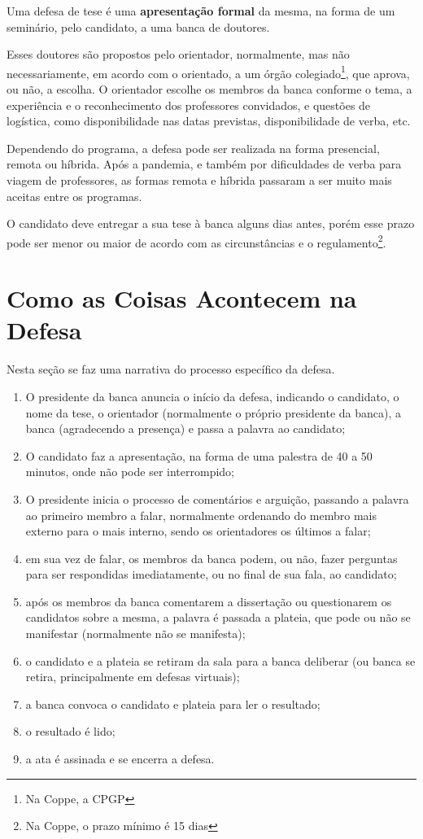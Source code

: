 Uma defesa de tese é uma \textbf{apresentação formal} da mesma, na forma de um seminário, pelo candidato, a uma banca de doutores.

Esses doutores são propostos pelo orientador, normalmente, mas não necessariamente, em acordo com o orientado, a um órgão colegiado\footnote{Na Coppe, a CPGP}, que aprova, ou não, a escolha. O orientador escolhe os membros da banca conforme o tema, a experiência e o reconhecimento dos professores convidados, e questões de logística, como disponibilidade nas datas previstas, disponibilidade de verba, etc.

Dependendo do programa, a defesa pode ser realizada na forma presencial, remota ou híbrida. Após a pandemia, e também por dificuldades de verba para viagem de professores, as formas remota e híbrida passaram a ser muito mais aceitas entre os programas.

O candidato deve entregar a sua tese  à banca alguns dias antes, porém esse prazo pode ser menor ou maior de acordo com as circunstâncias e o regulamento\footnote{Na Coppe, o prazo mínimo é 15 dias}. 


\section{Como as Coisas Acontecem na Defesa}

Nesta seção se faz uma narrativa do processo específico da defesa.

\begin{enumerate}
    \item O presidente da banca anuncia o início da defesa, indicando o candidato, o nome da tese, o orientador (normalmente o próprio presidente da banca), a banca (agradecendo a presença) e passa a palavra ao candidato;
    \item O candidato faz a apresentação, na forma de uma palestra de 40 a 50 minutos, onde não pode ser interrompido;
    \item O presidente inicia o processo de comentários e arguição, passando a palavra ao primeiro membro a falar, normalmente ordenando do membro mais externo para o mais interno, sendo os orientadores os últimos a falar;
    \item em sua vez de falar, os membros da banca podem, ou não, fazer perguntas para ser respondidas imediatamente, ou no final de sua fala, ao candidato;
    \item após os membros da banca comentarem a dissertação ou questionarem os candidatos sobre a mesma, a palavra é passada a plateia, que pode ou não se manifestar (normalmente não se manifesta);
    \item o candidato e a plateia se retiram da sala para a banca deliberar (ou banca se retira, principalmente em defesas virtuais);
    \item a banca convoca o candidato e plateia para ler o resultado;
    \item o resultado é lido;
    \item a ata é assinada e se encerra a defesa.
\end{enumerate}

